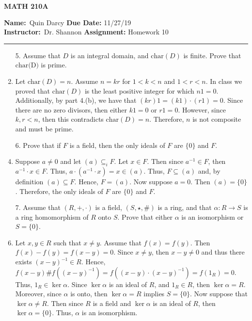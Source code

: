 \documentclass[12pt]{article}
\makeatletter
\theoremstyle{definition}
\theoremstyle{remark}
\renewenvironment{proof}[1][\proofname]{\par
  \pushQED{\qed}%
  \normalfont \topsep6\p@\@plus6\p@\relax
  \list{}{\leftmargin=0mm
          \rightmargin=4mm
          \settowidth{\itemindent}{\itshape#1}%
          \labelwidth=\itemindent
          \parsep=0pt \listparindent=\parindent 
  }
  \item[\hskip\labelsep
        \itshape
    #1\@addpunct{.}]\ignorespaces
}{%
  \popQED\endlist\@endpefalse
}
\let\oldproofname=\proofname
\renewcommand{\proofname}{\bf{\textit{\oldproofname}}}
\makeatother
\begin{document}
\begin{center}
	\vspace{.4cm} {\textbf { \large MATH 210A}}
\end{center}
{\textbf{Name:}\ Quin Darcy \hspace{\fill} \textbf{Due Date:} 11/27/19   \\
{ \textbf{Instructor:}}\ Dr. Shannon \hspace{\fill} \textbf{Assignment:} Homework 10 \\ \hrule}

\justifying

    \begin{enumerate}[leftmargin=*]
        \item[5.] Assume that $D$ is an integral domain, and $\text{char}(D)$ is finite. Prove that $\text{char(D)}$ is prime.
            \begin{proof}
                Let $\text{char}(D)=n$. Assume $n=kr$ for $1<k<n$ and $1<r<n$. In class we proved that $\text{char}(D)$ is the least positive integer for which $n1=0$. Additionally, by part 4.(b), we have that $(kr)1=(k1)\cdot(r1)=0$. Since there are no zero divisors, then either $k1=0$ or $r1=0$. However, since $k,r<n$, then this contradicts $\text{char}(D)=n$. Therefore, $n$ is not composite and must be prime. 
            \end{proof}
            
        \item[6.] Prove that if $F$ is a field, then the only ideals of $F$ are $\{0\}$ and $F$.
            \begin{proof}
                Suppose $a\neq 0$ and let $(a)\subseteq_i F$. Let $x\in F$. Then since $a^{-1}\in F$, then $a^{-1}\cdot x\in F$. Thus, $a\cdot(a^{-1}\cdot x)=x\in (a)$. Thus, $F\subseteq (a)$ and, by definition $(a)\subseteq F$. Hence, $F=(a)$. Now suppose $a=0$. Then $(a)=\{0\}$. Therefore, the only ideals of $F$ are $\{0\}$ and $F$. 
            \end{proof}
            
        \item[7.] Assume that $(R,+,\cdot)$ is a field, $(S,\star,\#)$ is a ring, and that $\alpha\colon R\rightarrow S$ is a ring homomorphism of $R$ onto $S$. Prove that either $\alpha$ is an isomorphism or $S=\{0\}$. 
            \begin{proof}
                Let $x,y\in R$ such that $x\neq y$. Assume that $f(x)=f(y)$. Then $f(x)-f(y)=f(x-y)=0$. Since $x\neq y$, then $x-y\neq 0$ and thus there exists $(x-y)^{-1}\in R$. Hence, $f(x-y)\#f((x-y)^{-1})=f((x-y)\cdot(x-y)^{-1})=f(1_R)=0$. Thus, $1_R\in\ker\alpha$. Since $\ker\alpha$ is an ideal of $R$, and $1_R\in R$, then $\ker\alpha=R$. Moreover, since $\alpha$ is onto, then $\ker\alpha=R$ implies $S=\{0\}$. Now suppose that $\ker\alpha\neq R$. Then since $R$ is a field and $\ker\alpha$ is an ideal of $R$, then $\ker\alpha=\{0\}$. Thus, $\alpha$ is an isomorphism.
            \end{proof}
            

\end{enumerate}
\end{document}
